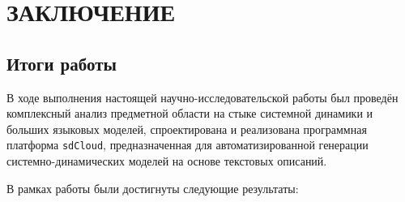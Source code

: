 
\chapter*{ЗАКЛЮЧЕНИЕ}

\section*{Итоги работы}

В ходе выполнения настоящей научно-исследовательской работы был проведён комплексный анализ предметной области на стыке системной динамики и больших языковых моделей, спроектирована и реализована программная платформа \texttt{sdCloud}, предназначенная для автоматизированной генерации системно-динамических моделей на основе текстовых описаний.

В рамках работы были достигнуты следующие результаты:

